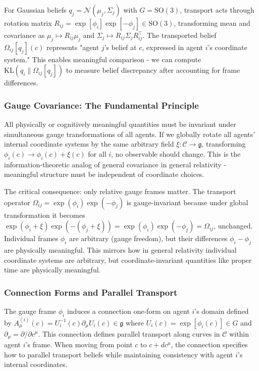 \documentclass[11pt]{article}
\begin{document}
For Gaussian beliefs $q_j = \mathcal{N}(\mu_j, \Sigma_j)$ with $G = \mathrm{SO}(3)$, transport acts through rotation matrix $R_{ij} = \exp[\phi_i]\exp[ - \phi_j] \in \mathrm{SO}(3)$, transforming mean and covariance as $\mu_j \mapsto R_{ij} \mu_j$ and $\Sigma_j \mapsto R_{ij} \Sigma_j R_{ij}^\top$. The transported belief $\Omega_{ij}[q_j](c)$ represents "agent $j$'s belief at $c$, expressed in agent $i$'s coordinate system." This enables meaningful comparison - we can compute $\mathrm{KL}(q_i \| \Omega_{ij}[q_j])$ to measure belief discrepancy after accounting for frame differences.

\subsubsection{Gauge Covariance: The Fundamental Principle}

All physically or cognitively meaningful quantities must be invariant under simultaneous gauge transformations of all agents. If we globally rotate all agents' internal coordinate systems by the same arbitrary field $\xi: \mathcal{C} \to \mathfrak{g}$, transforming $\phi_i(c) \to \phi_i(c) + \xi(c)$ for all $i$, no observable should change. This is the information-theoretic analog of general covariance in general relativity - meaningful structure must be independent of coordinate choices.

The critical consequence: only relative gauge frames matter. The transport operator $\Omega_{ij} = \exp(\phi_i)\exp(-\phi_j)$ is gauge-invariant because under global transformation it becomes $\exp(\phi_i + \xi)\exp(-(\phi_j + \xi)) = \exp(\phi_i)\exp(-\phi_j) = \Omega_{ij}$, unchanged. Individual frames $\phi_i$ are arbitrary (gauge freedom), but their differences $\phi_i - \phi_j$ are physically meaningful. This mirrors how in general relativity individual coordinate systems are arbitrary, but coordinate-invariant quantities like proper time are physically meaningful.

\subsubsection{Connection Forms and Parallel Transport}

The gauge frame $\phi_i$ induces a connection one-form on agent $i$'s domain defined by $A^{(i)}_\mu(c) = U_i^{-1}(c) \partial_\mu U_i(c) \in \mathfrak{g}$ where $U_i(c) = \exp[\phi_i(c)] \in G$ and $\partial_\mu = \partial/\partial c^\mu$. This connection defines parallel transport along curves in $\mathcal{C}$ within agent $i$'s frame. When moving from point $c$ to $c + dc^\mu$, the connection specifies how to parallel transport beliefs while maintaining consistency with agent $i$'s internal coordinates.
\end{document}
